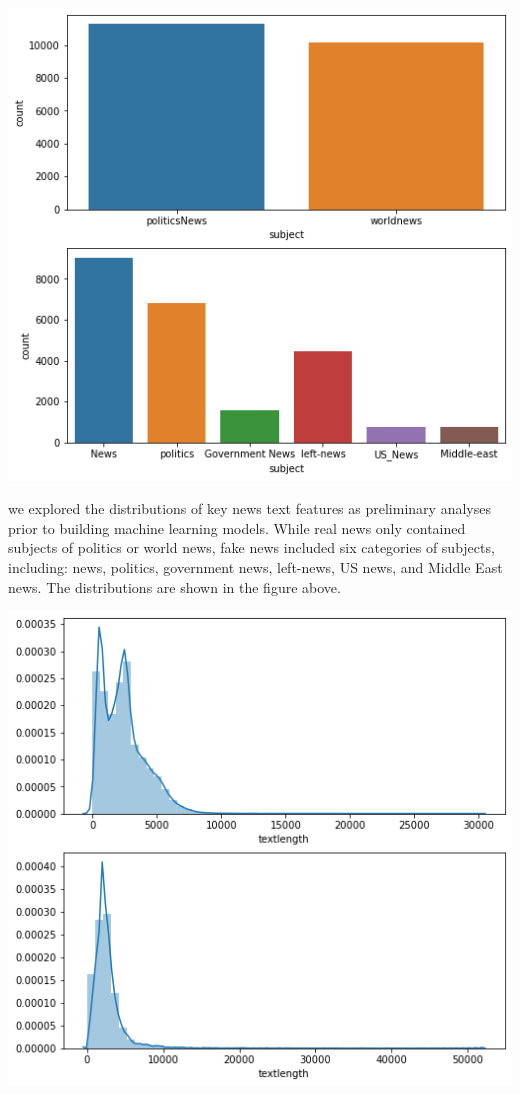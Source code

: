 \documentclass{article}
\begin{document}
\begin{multicols}{2}
\begin{center}
\includegraphics[scale=0.3]{images/img2.png}
\end{center}

we explored the distributions of key news text features as preliminary analyses prior to building machine learning models. While real news only contained subjects of politics or world news, fake news included six categories of subjects, including: news, politics, government news, left-news, US news, and Middle East news. The distributions are shown in the figure above. 


\begin{center}
\includegraphics[scale=0.4]{images/img3.png}
\end{center}



\end{multicols}
\end{document}
